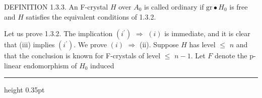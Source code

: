 \documentclass[9pt]{article}
\newcommand{\CanonText}[1]{\par{\fontsize{8.0}{9.35}\selectfont\RaggedRight #1\par}\vspace{2.2pt}}
\begin{document}
\begin{minipage}[t][\dimexpr\textheight-5pt\relax][t]{\textwidth}
\CanonText{DEFINITION 1.3.3. An F-crystal \(H\) over \(A_{0}\) is called ordinary if \(\text{gr}\bullet{}H_{0}\) is free and \(H\) satisfies the equivalent conditions of 1.3.2.}
\CanonText{Let us prove 1.3.2. The implication \((i^{\prime})\) \(\Rightarrow{}\) \((i)\) is immediate, and it is clear that (iii) implies \((i^{\prime})\). We prove \((i)\) \(\Rightarrow{}\) (ii). Suppose \(H\) has level \(\leq{}\) \(n\) and that the conclusion is known for F-crystals of level \(\leq{}\) \(n-1\). Let \(F\) denote the p-linear endomorphism of \(H_{0}\) induced}
\vfill
{\color{Accent}\hrule height 0.35pt}\vspace{3pt}
\end{minipage}
\newpage
\end{document}
